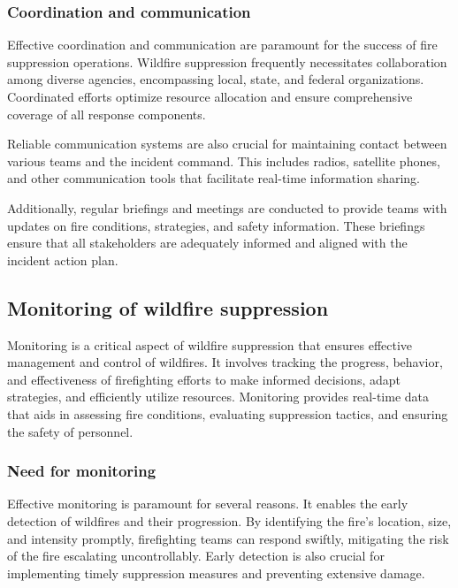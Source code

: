\documentclass[
  12 pt,
]{Nemilov}
\begin{document}
\subsubsection{Coordination and communication}\label{coordination-and-communication-1}

Effective coordination and communication are paramount for the success of fire suppression operations. Wildfire suppression frequently necessitates collaboration among diverse agencies, encompassing local, state, and federal organizations. Coordinated efforts optimize resource allocation and ensure comprehensive coverage of all response components.

Reliable communication systems are also crucial for maintaining contact between various teams and the incident command. This includes radios, satellite phones, and other communication tools that facilitate real-time information sharing.

Additionally, regular briefings and meetings are conducted to provide teams with updates on fire conditions, strategies, and safety information. These briefings ensure that all stakeholders are adequately informed and aligned with the incident action plan.

\subsection{Monitoring of wildfire suppression}\label{monitoring-of-wildfire-suppression}

Monitoring is a critical aspect of wildfire suppression that ensures effective management and control of wildfires. It involves tracking the progress, behavior, and effectiveness of firefighting efforts to make informed decisions, adapt strategies, and efficiently utilize resources. Monitoring provides real-time data that aids in assessing fire conditions, evaluating suppression tactics, and ensuring the safety of personnel.

\subsubsection{Need for monitoring}\label{need-for-monitoring}

Effective monitoring is paramount for several reasons. It enables the early detection of wildfires and their progression. By identifying the fire's location, size, and intensity promptly, firefighting teams can respond swiftly, mitigating the risk of the fire escalating uncontrollably. Early detection is also crucial for implementing timely suppression measures and preventing extensive damage.
\end{document}
